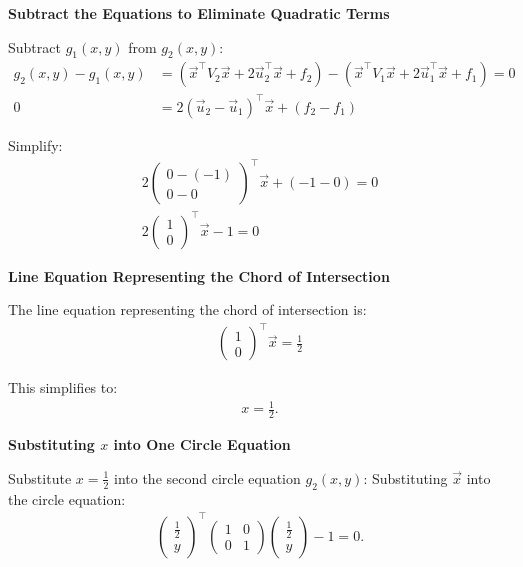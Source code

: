 \documentclass[journal]{IEEEtran}
\begin{document}
\textbf{ Subtract the Equations to Eliminate Quadratic Terms}

Subtract \( g_1(x, y) \) from \( g_2(x, y) \):
\begin{align}
    g_2(x, y) - g_1(x, y) &= (\vec{x}^\top V_2 \vec{x} + 2 \vec{u}_2^\top \vec{x} + f_2) - (\vec{x}^\top V_1 \vec{x} + 2 \vec{u}_1^\top \vec{x} + f_1) = 0 \\
    0 &= 2 (\vec{u}_2 - \vec{u}_1)^\top \vec{x} + (f_2 - f_1)
\end{align}

Simplify:
\begin{align}
    2 \begin{pmatrix} 0 - (-1) \\ 0 - 0 \end{pmatrix}^\top \vec{x} + (-1 - 0) = 0 \\
    2 \begin{pmatrix} 1 \\ 0 \end{pmatrix}^\top \vec{x} - 1 = 0
\end{align}

\textbf{ Line Equation Representing the Chord of Intersection}

The line equation representing the chord of intersection is:
\begin{align}
    \begin{pmatrix} 1 \\ 0 \end{pmatrix}^\top \vec{x} = \frac{1}{2}
\end{align}

This simplifies to:
\begin{align}
    x = \frac{1}{2}.
\end{align}

\textbf{ Substituting \( x \) into One Circle Equation}

Substitute \( x = \frac{1}{2} \) into the second circle equation \( g_2(x, y) \):
Substituting \(\vec{x}\) into the circle equation:
\begin{align}
    \begin{pmatrix} \frac{1}{2} \\ y \end{pmatrix}^\top \begin{pmatrix} 1 & 0 \\ 0 & 1 \end{pmatrix} \begin{pmatrix} \frac{1}{2} \\ y \end{pmatrix} - 1 = 0.
\end{align}
\end{document}
